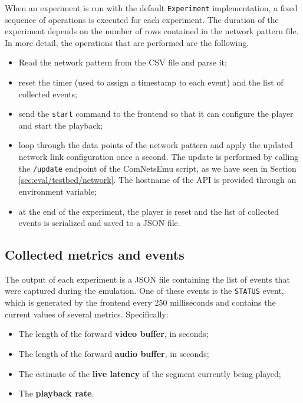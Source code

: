 When an experiment is run with the default \texttt{Experiment} implementation, a fixed sequence of operations is executed for each experiment. The duration of the experiment depends on the number of rows contained in the network pattern file. In more detail, the operations that are performed are the following.

\begin{itemize}
    \item Read the network pattern from the CSV file and parse it;
    \item reset the timer (used to assign a timestamp to each event) and the list of collected events;
    \item send the \texttt{start} command to the frontend so that it can configure the player and start the playback;
    \item loop through the data points of the network pattern and apply the updated network link configuration once a second. The update is performed by calling the \texttt{/update} endpoint of the ComNetsEmu script, as we have seen in Section \ref{sec:eval/testbed/network}. The hostname of the API is provided through an environment variable;
    \item at the end of the experiment, the player is reset and the list of collected events is serialized and saved to a JSON file.
\end{itemize}

\subsection{Collected metrics and events}
\label{sec:eval/testbed/metrics}

The output of each experiment is a JSON file containing the list of events that were captured during the emulation. One of these events is the \texttt{STATUS} event, which is generated by the frontend every 250 milliseconds and contains the current values of several metrics. Specifically:

\begin{itemize}
    \item The length of the forward \textbf{video buffer}, in seconds;
    \item The length of the forward \textbf{audio buffer}, in seconds;
    \item The estimate of the \textbf{live latency} of the segment currently being played;
    \item The \textbf{playback rate}.
\end{itemize}

